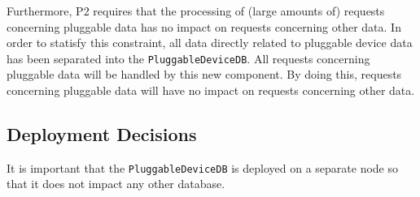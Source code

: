         Furthermore, P2 requires that the processing of (large amounts of) requests concerning pluggable
        data has no impact on requests concerning other data.
        In order to statisfy this constraint, all data directly related to
        pluggable device data has been separated into the \texttt{PluggableDeviceDB}.
        All requests concerning pluggable data will be handled by this new
        component. By doing this, requests concerning pluggable data will have no impact on
        requests concerning other data.

    \subsection*{Deployment Decisions}
        It is important that the \texttt{PluggableDeviceDB} is deployed on a separate node
        so that it does not impact any other database.

